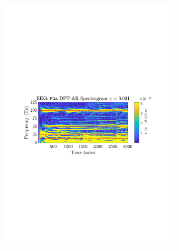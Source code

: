 \documentclass[12pt]{article}
\begin{document}
\begin{figure}[H]
\begin{subfigure}{0.49\textwidth}
					\includegraphics[trim={2.2cm 11.2cm 2.90cm  11.2cm}, clip, width=\textwidth]{../MATLAB/figures/q3_3d_fig02.pdf} 
					\captionsetup{justification=centering}
				\end{subfigure}
				

\end{figure}
\end{document}
